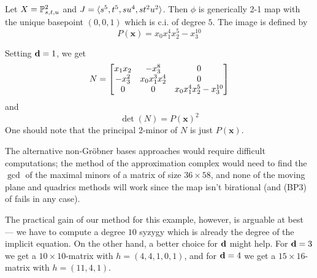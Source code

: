 \documentclass[fleqn,reqno]{amsart}
\begin{document}
\begin{example}[$\mt{ex308}$]
\label{ex308}
Let $X=\mathbb{P}^2_{s,t,u}$ and $J=\langle s^5,t^5,su^4,st^2u^2\rangle$.
Then $\phi$ is generically 2-1 map with the unique basepoint $(0,0,1)$
which is c.i. of degree $5$.
The image is defined by
\[
	P(\mathbf x)={x}_{0} {x}_{1}^{4} {x}_{2}^{5}-{x}_{3}^{10}
\]

Setting $\mathbf d=1$, we get
\[
	N=
	\bgroup\begin{bmatrix}{x}_{1} {x}_{2}&
      {-{x}_{3}^{8}}&
      0\\
      {-{x}_{3}^{2}}&
      {x}_{0} {x}_{1}^{3} {x}_{2}^{4}&
      0\\
      0&
      0&
      {x}_{0} {x}_{1}^{4} {x}_{2}^{5}-{x}_{3}^{10}\\
      \end{bmatrix}\egroup
\]
and
\[
	\det(N)=P(\mathbf x)^2
\]
One should note that the principal $2$-minor of $N$ is just $P(\mathbf x)$.

The alternative non-Gr\"obner bases approaches would require difficult computations;
the method of the approximation complex would need to find the $\gcd$ of the maximal
minors of a matrix of size $36\times58$, and none of the moving plane and quadrics
methods will work since the map isn't birational
(and (BP3) of \citet{BCD-03} fails in any case).

The practical gain of our method for this example, however, is arguable at best ---
we have to compute a degree $10$ syzygy which is already the degree of the implicit equation.
On the other hand, a better choice for $\mathbf d$ might help.
For $\mathbf d=3$ we get a $10\times10$-matrix with $h=(4,4,1,0,1)$,
and for $\mathbf d=4$ we get a $15\times16$-matrix with $h=(11,4,1)$.
\end{example}
\end{document}
